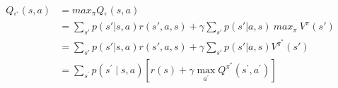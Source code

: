 \documentclass[11pt]{article}
\begin{document}
\begin{align*}
Q_^{\pi^*}(s,a) &= max_\pi Q_^{\pi}(s,a) \\
&= \sum_{s'} p(s' | s, a)r(s',a,s) + \gamma\sum_{s'} p(s' | a, s) \ max_\pi\  V^{\pi}(s') \\
&= \sum_{s'} p(s' | s, a)r(s',a,s) + \gamma\sum_{s'} p(s' | a, s) V^{\pi^*}(s') \\
&= \sum_{s^{\prime}} p\left(s^{\prime} \mid s, a\right)\left[r(s)+\gamma \max _{a^{\prime}} Q^{\pi^{*}}\left(s^{\prime}, a^{\prime}\right)\right]
\end{align*}



























{


}
\end{document}
